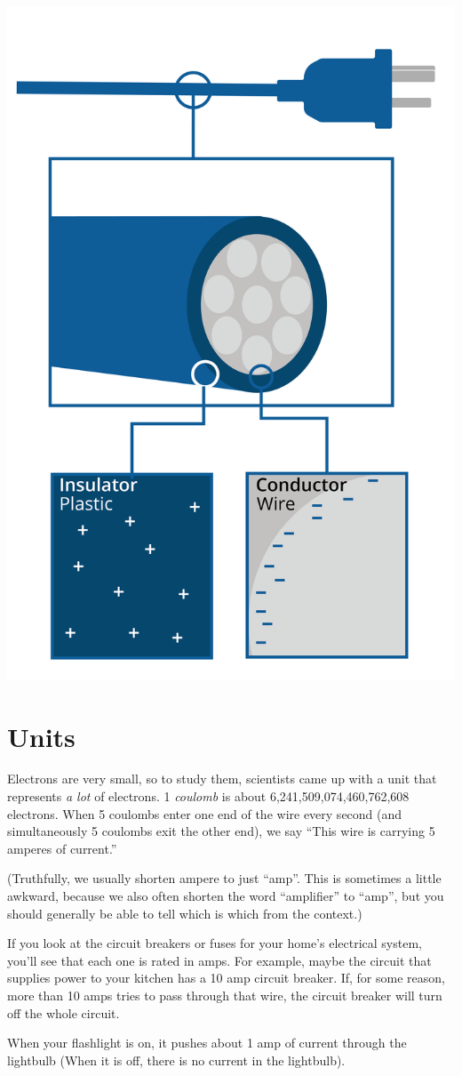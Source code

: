 \includegraphics[width=.5\textwidth]{plug.png}


\section{Units}

Electrons are very small, so to study them, scientists came up with a
unit that represents \textit{a lot} of electrons. 1 \textit{coulomb}
is about 6,241,509,074,460,762,608 electrons. When 5 coulombs enter one end of the wire every second (and simultaneously 5 coulombs exit the other end), we say ``This wire is carrying 5 amperes of current.''

(Truthfully, we usually shorten ampere to just ``amp''.  This is
sometimes a little awkward, because we also often shorten the word
``amplifier'' to ``amp'', but you should generally be able to tell which is which
from the context.)

If you look at the circuit breakers or fuses for your home's
electrical system, you'll see that each one is rated in amps. For
example, maybe the circuit that supplies power to your kitchen has a 10
amp circuit breaker. If, for some reason, more than 10 amps tries to
pass through that wire, the circuit breaker will turn off the whole
circuit.

When your flashlight is on, it pushes about 1 amp of current
through the lightbulb (When it is off, there is no current in the
lightbulb).


